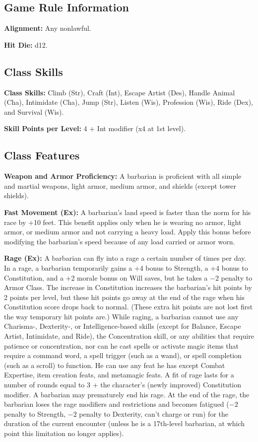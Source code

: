 \documentclass[10pt,a4paper,twocolumn]{d20}
\begin{document}
{\subsection{Game Rule Information}
\textbf{Alignment:} Any nonlawful.

\textbf{Hit Die:} d12.

\subsection{Class Skills}
\textbf{Class Skills:} Climb (Str), Craft (Int), Escape Artist (Des), Handle Animal (Cha), Intimidate (Cha), Jump (Str), Listen (Wis),    Profession (Wis), Ride (Dex), and Survival (Wis).

\textbf{Skill Points per Level:} 4 + Int modifier (x4 at 1st level).

\subsection{Class Features}

\textbf{Weapon and Armor Proficiency:} A barbarian is proficient with all simple and martial weapons, light armor, medium armor, and shields (except tower shields).

\textbf{Fast Movement (Ex):} A barbarian’s land speed is faster than the norm for his race by +10 feet. This benefit applies only when he is wearing no armor, light armor, or medium armor and not carrying a heavy load. Apply this bonus before modifying the barbarian’s speed because of any load carried or armor worn.

\textbf{Rage (Ex):} A barbarian can fly into a rage a certain number of times per day. In a rage, a barbarian temporarily gains a +4 bonus to Strength, a +4 bonus to Constitution, and a +2 morale bonus on Will saves, but he takes a $-2$ penalty to Armor Class. The increase in Constitution increases the barbarian’s hit points by 2 points per level, but these hit points go away at the end of the rage when his Constitution  score drops back to normal. (These extra hit points are not lost first the way temporary hit points are.) While raging, a barbarian cannot use any Charisma-, Dexterity-, or Intelligence-based skills (except for Balance, Escape Artist, Intimidate, and Ride), the Concentration skill, or any abilities that require patience or concentration, nor can he cast spells or activate magic items that require a command word, a spell trigger (such as a wand), or spell completion (such as a scroll) to function. He can use any feat he has except Combat Expertise, item creation feats, and metamagic feats. A fit of rage lasts for a number of rounds equal to 3 + the character’s (newly improved) Constitution modifier. A barbarian may prematurely end his rage. At the end of the rage, the barbarian loses the rage modifiers and restrictions and becomes fatigued ($-2$ penalty to Strength, $-2$ penalty to Dexterity, can’t charge or run) for the duration of the current encounter (unless he is a 17th-level barbarian, at which point this limitation no longer applies).

}
\end{document}
